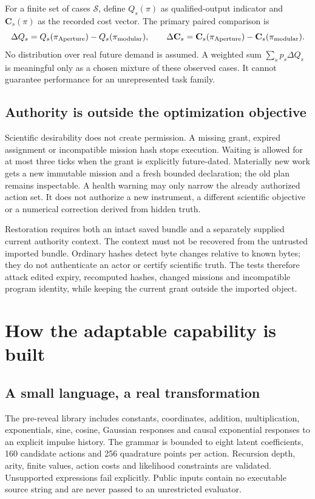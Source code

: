 \documentclass[11pt,letterpaper]{article}
\begin{document}
For a finite set of cases $\mathcal S$, define $Q_s(\pi)$ as qualified-output indicator and $\mathbf C_s(\pi)$ as the recorded cost vector. The primary paired comparison is
\begin{equation}
\Delta Q_s=Q_s(\pi_{\rm Aperture})-Q_s(\pi_{\rm modular}),\qquad
\Delta\mathbf C_s=\mathbf C_s(\pi_{\rm Aperture})-\mathbf C_s(\pi_{\rm modular}).
\end{equation}
No distribution over real future demand is assumed. A weighted sum $\sum_s p_s\Delta Q_s$ is meaningful only as a chosen mixture of these observed cases. It cannot guarantee performance for an unrepresented task family.

\subsection{Authority is outside the optimization objective}

Scientific desirability does not create permission. A missing grant, expired assignment or incompatible mission hash stops execution. Waiting is allowed for at most three ticks when the grant is explicitly future-dated. Materially new work gets a new immutable mission and a fresh bounded declaration; the old plan remains inspectable. A health warning may only narrow the already authorized action set. It does not authorize a new instrument, a different scientific objective or a numerical correction derived from hidden truth.

Restoration requires both an intact saved bundle and a separately supplied current authority context. The context must not be recovered from the untrusted imported bundle. Ordinary hashes detect byte changes relative to known bytes; they do not authenticate an actor or certify scientific truth. The tests therefore attack edited expiry, recomputed hashes, changed missions and incompatible program identity, while keeping the current grant outside the imported object.

\section{How the adaptable capability is built}

\subsection{A small language, a real transformation}

The pre-reveal library includes constants, coordinates, addition, multiplication, exponentials, sine, cosine, Gaussian responses and causal exponential responses to an explicit impulse history. The grammar is bounded to eight latent coefficients, 160 candidate actions and 256 quadrature points per action. Recursion depth, arity, finite values, action costs and likelihood constraints are validated. Unsupported expressions fail explicitly. Public inputs contain no executable source string and are never passed to an unrestricted evaluator.
\end{document}
